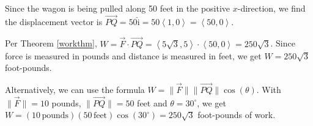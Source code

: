 \documentclass{ximera}
\begin{document}
\begin{example}
\begin{explanation}
 

  Since the wagon is being pulled along 50 feet in the positive $x$-direction, we find the displacement vector is $\overrightarrow{PQ} = 50 \hat{\text{i}} = 50\left<1,0\right> = \left<50,0\right>$.  
  
 
  
Per Theorem \ref{workthm},  $W = \overrightarrow{F} \cdot \overrightarrow{PQ} = \left<5\sqrt{3}, 5\right> \cdot \left<50,0\right> = 250\sqrt{3}$.  Since  force is measured in pounds and distance is measured in feet, we get $W = 250\sqrt{3}$ foot-pounds.  
  
 
  
 Alternatively, we can use the formula $W =  \| \overrightarrow{F} \| \| \overrightarrow{PQ} \| \cos(\theta)$.  With $\| \overrightarrow{F} \| = 10$ pounds, $\| \overrightarrow{PQ} \| = 50$ feet and $\theta = 30^{\circ}$, we get $W = (10 \, \text{pounds})(50 \, \text{feet}) \cos\left(30^{\circ}\right) = 250 \sqrt{3}$ foot-pounds of work. 
\end{explanation}
\end{example}



\closegraphsfile
\end{document}
